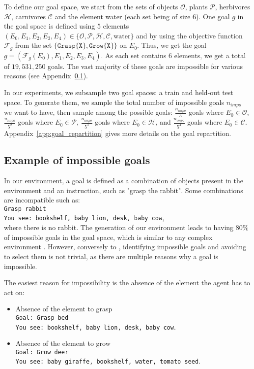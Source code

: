 To define our goal space, we start from the sets of objects $\mathcal{O}$, plants $\mathcal{P}$, herbivores $\mathcal{H}$, carnivores $\mathcal{C}$ and the element water (each set being of size $6$). One goal $g$ in the goal space is defined using $5$ elements $(E_0, E_1, E_2, E_3, E_4) \in \{ \mathcal{O}, \mathcal{P}, \mathcal{H}, \mathcal{C}, \text{water} \}$ and by using the objective function $\mathcal{F}_{g}$ from the set $\{\texttt{Grasp\{X\}}, \texttt{Grow\{X\}}\}$ on $E_0$. Thus, we get the goal $g=(\mathcal{F}_{g}(E_0), E_1, E_2, E_3, E_4)$. As each set contains $6$ elements, we get a total of $19,531,250$ goals. The vast majority of these goals are impossible for various reasons (see Appendix~\ref{app:example_of_impossible_goals}).

In our experiments, we subsample two goal spaces: a train and held-out test space. To generate them, we sample the total number of impossible goals $n_{impo}$ we want to have, then sample among the possible goals: $\frac{n_{impo}}{5}$ goals where $E_0 \in \mathcal{O}$, $\frac{n_{impo}}{5^2}$ goals where $E_0 \in \mathcal{P}$, $\frac{n_{impo}}{5^3}$ goals where $E_0 \in \mathcal{H}$, and $\frac{n_{impo}}{5^4}$ goals where $E_0 \in \mathcal{C}$. Appendix~\ref{app:goal_repartition} gives more details on the goal repartition.

\subsection{Example of impossible goals}
\label{app:example_of_impossible_goals}

In our environment, a goal is defined as a combination of objects present in the environment and an instruction, such as "grasp the rabbit". Some combinations are incompatible such as:\\ \texttt{Grasp rabbit \\ You see: bookshelf, baby lion, desk, baby cow}, \\
where there is no rabbit. The generation of our environment leads to having $80\%$ of impossible goals in the goal space, which is similar to any complex environment \cite{zhang_omni_2024, matthews2024kinetixinvestigatingtraininggeneral}. However, conversely to \cite{zhang_omni_2024}, identifying impossible goals and avoiding to select them is not trivial, as there are multiple reasons why a goal is impossible.

The easiest reason for impossibility is the absence of the element the agent has to act on:
\begin{itemize}
    \item Absence of the element to grasp \\
\texttt{Goal: Grasp bed \\
You see: bookshelf, baby lion, desk, baby cow}.
\item Absence of the element to grow \\
\texttt{Goal: Grow deer \\
You see: baby giraffe, bookshelf, water, tomato seed}.
\end{itemize}

